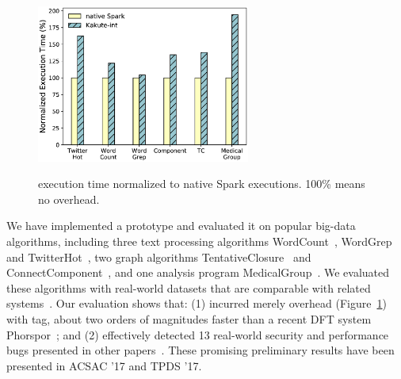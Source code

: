 \begin{figure}
  \vspace{-.1in}
  \includegraphics[width=7cm]{figures/time_overhead.ps}\\
  \vspace{-.3in}
  \caption{\kakute execution time normalized to native Spark executions. 100\% 
means no overhead.}
  \label{fig:scalability}
\end{figure}

 We have implemented a \kakute prototype 
and evaluated it on \appeval popular big-data algorithms, including three text 
processing algorithms WordCount~\cite{spark:example}, 
WordGrep~\cite{newt:socc13} and TwitterHot~\cite{spark:example}, two graph 
algorithms TentativeClosure~\cite{spark:example}
and ConnectComponent~\cite{spark:example}, and one analysis program 
MedicalGroup~\cite{pigmix}.
We evaluated these algorithms with 
real-world datasets that are comparable with related 
systems~\cite{vldb16:output, icse16:bigdebug, vldb15:titian}.
Our evaluation shows that: (1) \kakute 
incurred merely \timeavg overhead (Figure~\ref{fig:scalability}) with 
 tag, about two orders of magnitudes faster than a recent DFT 
system Phorspor~\cite{oo14:phosphor}; and (2) \kakute effectively 
detected 13 real-world security and performance bugs presented in other 
papers~\cite{arthur:dave2013,icse16:bigdebug,airavat:nsdi10}. These promising 
preliminary results have been presented in ACSAC '17 and TPDS '17.












